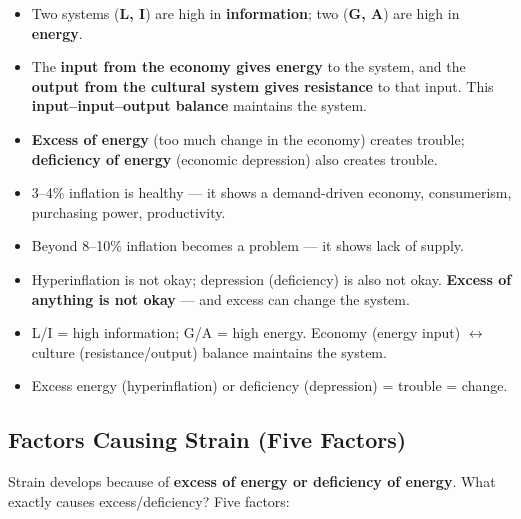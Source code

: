 \begin{KeyConcept}
\begin{itemize}
\item Two systems (\textbf{L, I}) are high in \textbf{information}; two (\textbf{G, A}) are high in \textbf{energy}.
\item The \textbf{input from the economy gives energy} to the system, and the \textbf{output from the cultural system gives resistance} to that input. This \textbf{input--input--output balance} maintains the system.
\item \textbf{Excess of energy} (too much change in the economy) creates trouble; \textbf{deficiency of energy} (economic depression) also creates trouble.
\end{itemize}
\end{KeyConcept}

\begin{DataFact}
\begin{itemize}
\item 3--4\% inflation is healthy --- it shows a demand-driven economy, consumerism, purchasing power, productivity.
\item Beyond 8--10\% inflation becomes a problem --- it shows lack of supply.
\item Hyperinflation is not okay; depression (deficiency) is also not okay. \textbf{Excess of anything is not okay} --- and excess can change the system.
\end{itemize}
\end{DataFact}

\begin{QuickRevision}
\begin{itemize}
\item L/I = high information; G/A = high energy. Economy (energy input) $\leftrightarrow$ culture (resistance/output) balance maintains the system.
\item Excess energy (hyperinflation) or deficiency (depression) = trouble = change.
\end{itemize}
\end{QuickRevision}

\sectiondivider

\subsection{Factors Causing Strain (Five Factors)}

Strain develops because of \textbf{excess of energy or deficiency of energy}. What exactly causes excess/deficiency? Five factors:

